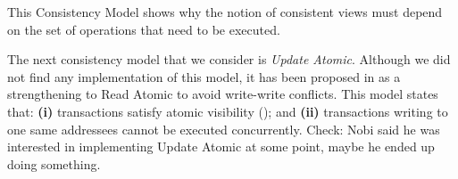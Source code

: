  
 

\ac{This Consistency Model shows why the notion of consistent views must 
depend on the set of operations that need to be executed.}

The next consistency model that we consider is \emph{Update Atomic}. 
Although we did not find any implementation of this model, it has been proposed in \cite{framework-concur} as a strengthening to Read Atomic to avoid write-write conflicts.
This model states that: \textbf{(i)} transactions satisfy atomic visibility (); and \textbf{(ii)} transactions writing to one same addressees cannot be executed concurrently.
\ac{Check: Nobi said he was interested in implementing Update Atomic 
at some point, maybe he ended up doing something.}

